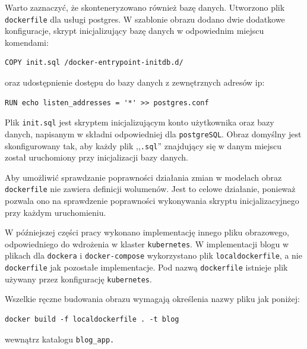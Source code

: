 \documentclass[12pt,twoside]{article}
\begin{document}
Warto zaznaczyć, że skonteneryzowano również bazę danych. Utworzono plik \texttt{dockerfile} dla usługi postgres. W szablonie obrazu dodano dwie dodatkowe konfiguracje, skrypt inicjalizujący bazę danych w odpowiednim miejscu komendami:
\begin{lstlisting}
COPY init.sql /docker-entrypoint-initdb.d/
\end{lstlisting}
oraz udostępnienie dostępu do bazy danych z zewnętrznych adresów ip:
\begin{lstlisting}
RUN echo listen_addresses = '*' >> postgres.conf
\end{lstlisting}

Plik \texttt{init.sql} jest skryptem inicjalizującym konto użytkownika oraz bazy danych, napisanym w składni odpowiedniej dla \texttt{postgreSQL}. Obraz domyślny jest skonfigurowany tak, aby każdy plik ,,\texttt{.sql}'' znajdujący się w danym miejscu został uruchomiony przy inicjalizacji bazy danych.

Aby umożliwić sprawdzanie poprawności działania zmian w modelach obraz \texttt{dockerfile} nie zawiera definicji wolumenów. Jest to celowe działanie, ponieważ pozwala ono na sprawdzenie poprawności wykonywania skryptu inicjalizacyjnego przy każdym uruchomieniu.

W późniejszej części pracy wykonano implementację innego pliku obrazowego, odpowiedniego do wdrożenia w klaster \texttt{kubernetes}. W implementacji blogu w plikach dla \texttt{dockera} i \texttt{docker-compose} wykorzystano plik \texttt{localdockerfile}, a nie \texttt{dockerfile} jak pozostałe implementacje. Pod nazwą \texttt{dockerfile} istnieje plik używany przez konfigurację \texttt{kubernetes}.

Wszelkie ręczne budowania obrazu wymagają określenia nazwy pliku jak poniżej:
\begin{lstlisting}
docker build -f localdockerfile . -t blog
\end{lstlisting}
wewnątrz katalogu \verb|blog_app.|
\end{document}
